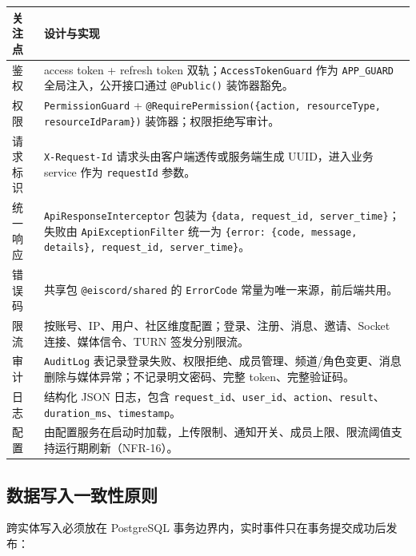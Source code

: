 \noindent\begin{tabularx}{\textwidth}{L{3.4cm}Y}
  \toprule
  关注点 & 设计与实现 \\
  \midrule
  鉴权 & access token + refresh token 双轨；\texttt{AccessTokenGuard} 作为 \texttt{APP\_GUARD} 全局注入，公开接口通过 \texttt{@Public()} 装饰器豁免。 \\
  权限 & \texttt{PermissionGuard} + \texttt{@RequirePermission(\{action, resourceType, resourceIdParam\})} 装饰器；权限拒绝写审计。 \\
  请求标识 & \texttt{X-Request-Id} 请求头由客户端透传或服务端生成 UUID，进入业务 service 作为 \texttt{requestId} 参数。 \\
  统一响应 & \texttt{ApiResponseInterceptor} 包装为 \texttt{\{data, request\_id, server\_time\}}；失败由 \texttt{ApiExceptionFilter} 统一为 \texttt{\{error: \{code, message, details\}, request\_id, server\_time\}}。 \\
  错误码 & 共享包 \texttt{@eiscord/shared} 的 \texttt{ErrorCode} 常量为唯一来源，前后端共用。 \\
  限流 & 按账号、IP、用户、社区维度配置；登录、注册、消息、邀请、Socket 连接、媒体信令、TURN 签发分别限流。 \\
  审计 & \texttt{AuditLog} 表记录登录失败、权限拒绝、成员管理、频道/角色变更、消息删除与媒体异常；不记录明文密码、完整 token、完整验证码。 \\
  日志 & 结构化 JSON 日志，包含 \texttt{request\_id}、\texttt{user\_id}、\texttt{action}、\texttt{result}、\texttt{duration\_ms}、\texttt{timestamp}。 \\
  配置 & 由配置服务在启动时加载，上传限制、通知开关、成员上限、限流阈值支持运行期刷新（NFR-16）。 \\
  \bottomrule
\end{tabularx}

\subsection{数据写入一致性原则}

跨实体写入必须放在 PostgreSQL 事务边界内，实时事件只在事务提交成功后发布：

